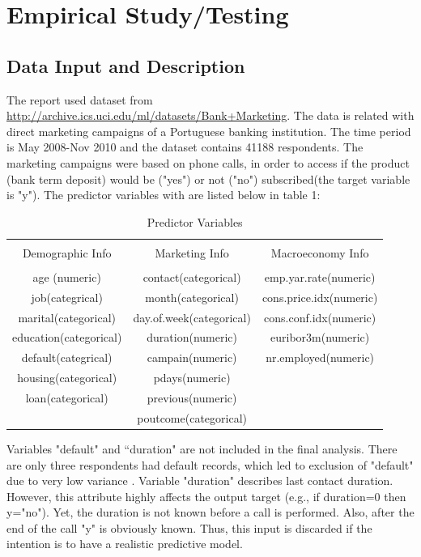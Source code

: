     \section{Empirical Study/Testing}
    \subsection{Data Input and Description}
    \noindent The report used dataset from \url{http://archive.ics.uci.edu/ml/datasets/Bank+Marketing}. The data is related with direct marketing campaigns of a Portuguese banking institution. The time period is May 2008-Nov 2010 and the dataset contains 41188 respondents. The marketing campaigns were based on phone calls, in order to access if the product (bank term deposit) would be ("yes") or not ("no") subscribed(the target variable is "y"). The predictor variables with  are listed below in table 1:\\
    \begin{center}
	\begin{table}[!hbp] \centering \label{}  
		\begin{tabular}{ccc} 
			\hline\hline \\[-1.8ex] 
			{Demographic Info}  & {Marketing Info} & {Macroeconomy Info} 
			\\ 
			\hline \\[-1.8ex] 
			age (numeric) & contact(categorical) & emp.yar.rate(numeric)
			\\ 
			job(categrical) & month(categorical) & cons.price.idx(numeric)
			\\ 
			marital(categorical) & day.of.week(categorical) & cons.conf.idx(numeric)
			\\ 
			education(categorical) & duration(numeric) & euribor3m(numeric)
			\\ 
			default(categrical) & campain(numeric) & nr.employed(numeric)
			\\ 
			housing(categorical) & pdays(numeric)
			\\ 
			loan(categorical) & previous(numeric) 
			\\ 
			 & poutcome(categorical) 
			\\ 
			\hline\hline 
		\end{tabular} 
		\caption{Predictor Variables}
    	\end{table}
        \end{center}
        Variables "default" and “duration" are not included in the final analysis. There are only three respondents had default records, which led to exclusion of "default" due to very low variance \citep{max2016applied}. Variable "duration" describes last contact duration. However, this attribute highly affects the output target (e.g., if duration=0 then y="no"). Yet, the duration is not known before a call is performed. Also, after the end of the call "y" is obviously known. Thus, this input is discarded if the intention is to have a realistic predictive model.\\               
